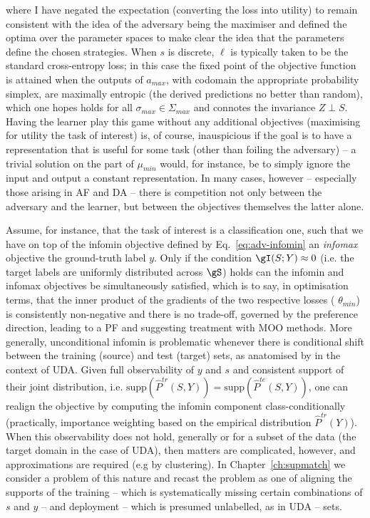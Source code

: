 %
where I have negated the expectation (converting the loss into utility) to remain consistent with
the idea of the adversary being the maximiser and defined the optima over the parameter spaces to
make clear the idea that the parameters define the chosen strategies. 
%
When \(s\) is discrete, \(\ell\) is typically taken to be the standard cross-entropy loss; in this
case the fixed point of the objective function is attained when the outputs of \(a_{max}\), with
codomain the appropriate probability simplex, are maximally entropic (the derived predictions no
better than random), which one hopes holds for all \(\sigma_{max} \in \Sigma_{max}\) and connotes
the invariance \(Z \perp S\).
%
%
Having the learner play this game without any additional objectives (maximising for utility \wrt{}
the task of interest) is, of course, inauspicious if the goal is to have a representation that is
useful for some task (other than foiling the adversary) -- a trivial solution on the part of
\(\mu_{min}\) would, for instance, be to simply ignore the input and output a constant
representation.
%
In many cases, however -- especially those arising in \ac{AF} and \ac{DA} -- there is competition not
only between the adversary and the learner, but between the objectives themselves \wrt{} the latter
alone.
%

Assume, for instance, that the task of interest is a classification one, such that we have on top
of the infomin objective defined by Eq.~\ref{eq:adv-infomin} an \emph{infomax} objective \wrt{} the
ground-truth label \(y\).
%
Only if the condition \( \gI(S; Y) \approx 0 \) (i.e. the target labels are uniformly distributed
across \(\gS\)) holds can the infomin and infomax objectives be simultaneously satisfied, which is
to say, in optimisation terms, that the inner product of the gradients of the two respective losses
(\wrt{} \(\theta_{min}\)) is consistently non-negative and there is no trade-off, governed by the
preference direction, leading to a \ac{PF} and suggesting treatment with \ac{MOO} methods.
%
More generally, unconditional infomin is problematic whenever there is conditional shift between
the training (source) and test (target) sets, as anatomised by \cite{zhao2019learning} in the
context of \ac{UDA}. 
%
Given full observability of \(y\) and \(s\) and consistent support of their joint distribution,
i.e. \(\text{supp}(\hat{P}^{tr}(S, Y)) = \text{supp}(\hat{P}^{te}(S, Y))\), one can realign the
objective by computing the infomin component class-conditionally (practically, importance weighting
based on the empirical distribution \(\hat{P}^{tr}(Y)\)). 
%
When this observability does not hold, generally or for a subset of the data (the target domain in
the case of \ac{UDA}), then matters are complicated, however, and approximations are required (e.g by
clustering).
%
In Chapter~\ref{ch:supmatch} we consider a problem of this nature and recast the problem as one of
aligning the supports of the training -- which is systematically missing certain combinations of
\(s\) and \(y\) -- and deployment -- which is presumed unlabelled, as in \ac{UDA} -- sets.

